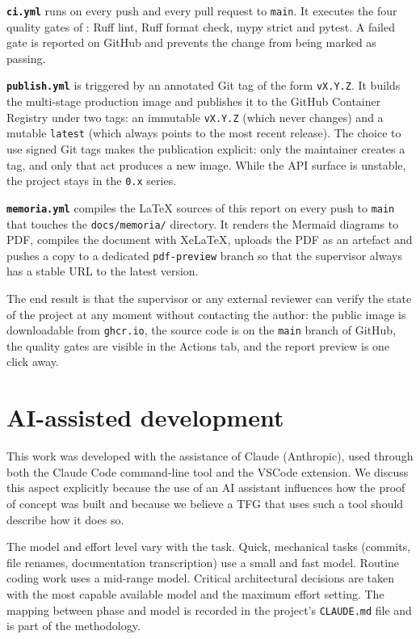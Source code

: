 \textbf{\texttt{ci.yml}} runs on every push and every pull request
to \texttt{main}. It executes the four quality gates of
: Ruff lint, Ruff format check, mypy strict and
pytest. A failed gate is reported on GitHub and prevents the change
from being marked as passing.

\textbf{\texttt{publish.yml}} is triggered by an annotated Git tag
of the form \texttt{vX.Y.Z}. It builds the multi-stage production
image and publishes it to the GitHub Container Registry under two
tags: an immutable \texttt{vX.Y.Z} (which never changes) and a
mutable \texttt{latest} (which always points to the most recent
release). The choice to use signed Git tags makes the publication
explicit: only the maintainer creates a tag, and only that act
produces a new image. While the API surface is unstable, the project
stays in the \texttt{0.x} series.

\textbf{\texttt{memoria.yml}} compiles the LaTeX sources of this
report on every push to \texttt{main} that touches the
\texttt{docs/memoria/} directory. It renders the Mermaid diagrams to
PDF, compiles the document with XeLaTeX, uploads the PDF as an
artefact and pushes a copy to a dedicated \texttt{pdf-preview}
branch so that the supervisor always has a stable URL to the latest
version.

The end result is that the supervisor or any external reviewer can
verify the state of the project at any moment without contacting
the author: the public image is downloadable from \texttt{ghcr.io},
the source code is on the \texttt{main} branch of GitHub, the
quality gates are visible in the Actions tab, and the report
preview is one click away.

\section{AI-assisted development}
\label{sec:ia}

This work was developed with the assistance of Claude (Anthropic),
used through both the Claude Code command-line tool and the VSCode
extension. We discuss this aspect explicitly because the use of an
AI assistant influences how the proof of concept was built and
because we believe a TFG that uses such a tool should describe how
it does so.

The model and effort level vary with the task. Quick, mechanical
tasks (commits, file renames, documentation transcription) use a
small and fast model. Routine coding work uses a mid-range model.
Critical architectural decisions are taken with the most capable
available model and the maximum effort setting. The mapping between
phase and model is recorded in the project's \texttt{CLAUDE.md}
file and is part of the methodology.

